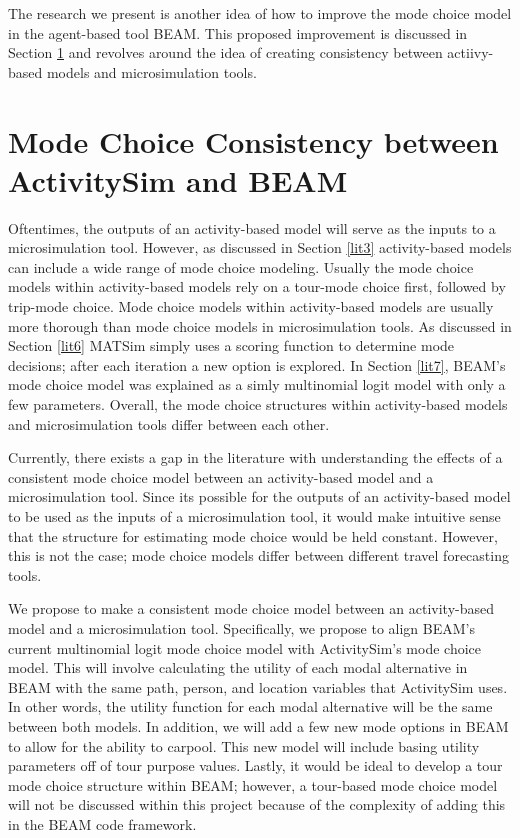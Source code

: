 \documentclass[12pt, oneside, openright]{byuthesis}
\begin{document}
The research we present is another idea of how to improve the mode choice model in the agent-based tool BEAM. This proposed improvement is discussed in Section \ref{lit9} and revolves around the idea of creating consistency between actiivy-based models and microsimulation tools.

\hypertarget{lit9}{%
\section{Mode Choice Consistency between ActivitySim and BEAM}\label{lit9}}

Oftentimes, the outputs of an activity-based model will serve as the inputs to a microsimulation tool. However, as discussed in Section \ref{lit3} activity-based models can include a wide range of mode choice modeling. Usually the mode choice models within activity-based models rely on a tour-mode choice first, followed by trip-mode choice. Mode choice models within activity-based models are usually more thorough than mode choice models in microsimulation tools. As discussed in Section \ref{lit6} MATSim simply uses a scoring function to determine mode decisions; after each iteration a new option is explored. In Section \ref{lit7}, BEAM's mode choice model was explained as a simly multinomial logit model with only a few parameters. Overall, the mode choice structures within activity-based models and microsimulation tools differ between each other.

Currently, there exists a gap in the literature with understanding the effects of a consistent mode choice model between an activity-based model and a microsimulation tool. Since its possible for the outputs of an activity-based model to be used as the inputs of a microsimulation tool, it would make intuitive sense that the structure for estimating mode choice would be held constant. However, this is not the case; mode choice models differ between different travel forecasting tools.

We propose to make a consistent mode choice model between an activity-based model and a microsimulation tool. Specifically, we propose to align BEAM's current multinomial logit mode choice model with ActivitySim's mode choice model. This will involve calculating the utility of each modal alternative in BEAM with the same path, person, and location variables that ActivitySim uses. In other words, the utility function for each modal alternative will be the same between both models. In addition, we will add a few new mode options in BEAM to allow for the ability to carpool. This new model will include basing utility parameters off of tour purpose values. Lastly, it would be ideal to develop a tour mode choice structure within BEAM; however, a tour-based mode choice model will not be discussed within this project because of the complexity of adding this in the BEAM code framework.
\end{document}
